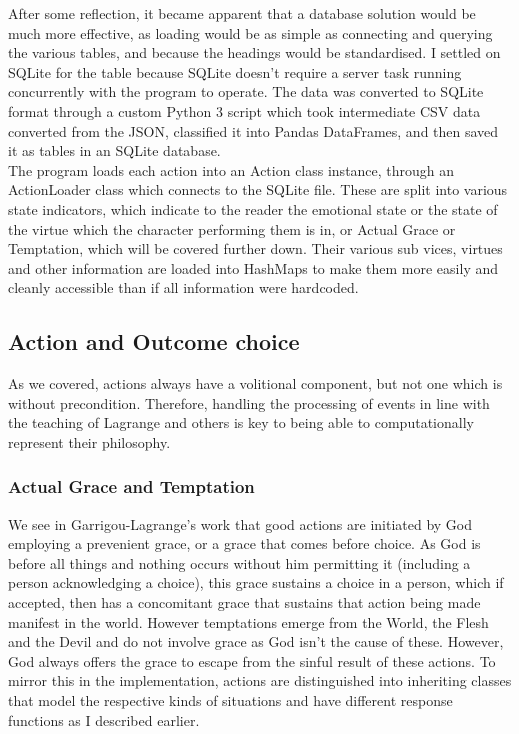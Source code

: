 \documentclass[11pt]{article}
\begin{document}
After some reflection, it became apparent that a database solution would be much more effective, as loading would be as simple as connecting and querying the various tables, and because the headings would be standardised. I settled on SQLite for the table because SQLite doesn't require a server task running concurrently with the program to operate. The data was converted to SQLite format through a custom Python 3 script which took intermediate CSV data converted from the JSON, classified it into Pandas DataFrames, and then saved it as tables in an SQLite database.\\

The program loads each action into an Action class instance, through an ActionLoader class which connects to the SQLite file. These are split into various state indicators, which indicate to the reader the emotional state or the state of the virtue which the character performing them is in, or Actual Grace or Temptation, which will be covered further down. Their various sub vices, virtues and other information are loaded into HashMaps to make them more easily and cleanly accessible than if all information were hardcoded. 

\subsection{Action and Outcome choice}
As we covered, actions always have a volitional component, but not one which is without precondition. Therefore, handling the processing of events in line with the teaching of Lagrange and others is key to being able to computationally represent their philosophy. \\
\subsubsection{Actual Grace and Temptation}
We see in Garrigou-Lagrange's work \cite{garrigou2013three} that good actions are initiated by God employing a prevenient grace, or a grace that comes before choice. As God is before all things and nothing occurs without him permitting it (including a person acknowledging a choice), this grace sustains a choice in a person, which if accepted, then has a concomitant grace that sustains that action being made manifest in the world. However temptations emerge from the World, the Flesh and the Devil and do not involve grace as God isn't the cause of these. However, God always offers the grace to escape from the sinful result of these actions. To mirror this in the implementation, actions are distinguished into inheriting classes that model the respective kinds of situations and have different response functions as I described earlier. \\
\end{document}
